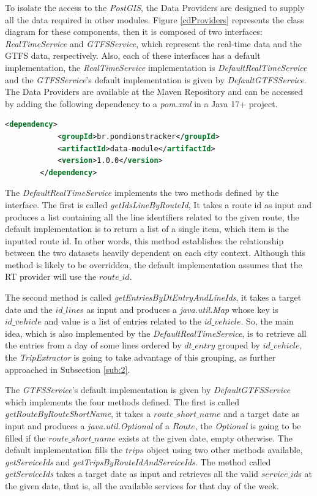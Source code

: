 To isolate the access to the \textit{PostGIS}, the Data Providers are designed to 
supply all the data  required in other modules. Figure \ref{cdProviders} represents the class diagram for these components, then
it is composed of two interfaces: \textit{RealTimeService} and \textit{GTFSService}, which represent the real-time data 
and the GTFS data, respectively. 
Also, each of these interfaces has a default implementation, 
the \textit{RealTimeService} implementation is \textit{DefaultRealTimeService} 
and the \textit{GTFSService}'s default implementation is given by \textit{DefaultGTFSService}. 
The Data Providers are available at the Maven Repository and can be accessed by adding the 
following dependency to a \textit{pom.xml} in a Java 17+ project.
\begin{lstlisting}[language=XML]
		<dependency>
			<groupId>br.pondionstracker</groupId>
			<artifactId>data-module</artifactId>
			<version>1.0.0</version>
		</dependency>
\end{lstlisting}

The \textit{DefaultRealTimeService} implements the two methods defined by the interface. 
The first is called \textit{getIdsLineByRouteId}, It takes a route id
as input and produces a list containing all the line identifiers related to the given route, 
the default implementation is to return a list of a single item, which item is the inputted route id.
In other words, this method establishes the relationship between the two datasets heavily dependent
on each city context. Although this method is likely to be overridden, 
the default implementation assumes that the RT provider will use the $route\_id$.

The second method is called \textit{getEntriesByDtEntryAndLineIds}, it takes a target date and 
the $id\_line$s as input and produces a \textit{java.util.Map} whose key is $id\_vehicle$ and value
is a list of entries related to the $id\_vehicle$. So, the main idea, which is also implemented by the  
\textit{DefaultRealTimeService}, is to retrieve all the entries from a day of some lines ordered by $dt\_entry$ grouped by 
$id\_vehicle$, the \textit{TripExtractor} is going to take advantage of this grouping, 
as further approached in Subsection \ref{sub:2}.

The \textit{GTFSService}'s default implementation is given by \textit{DefaultGTFSService} 
which implements the four methods defined. The first is called \textit{getRouteByRouteShortName},
it takes a $route\_short\_name$ and a target date as input and produces a 
\textit{java.util.Optional} of a 
$Route$, the \textit{Optional} is going to be filled if the $route\_short\_name$ exists at the given date,
empty otherwise. The default implementation fills the $trips$ object using two other methods available,
\textit{getServiceIds} and \textit{getTripsByRouteIdAndServiceIds}. The method called \textit{getServiceIds}
takes a target date as input and retrieves all the valid $service\_id$s at the given date, that is, all the 
available services for that day of the week.

